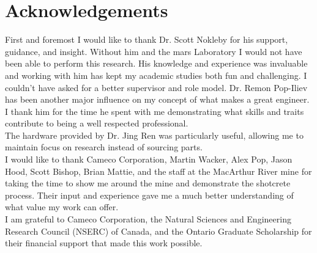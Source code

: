 \chapter*{Acknowledgements}
First and foremost I would like to thank Dr. Scott Nokleby for his support, guidance, and insight. Without him and the \acrshort{mars} Laboratory I would not have been able to perform this research. His knowledge and experience was invaluable and working with him has kept my academic studies both fun and challenging. I couldn't have asked for a better supervisor and role model. Dr. Remon Pop-Iliev has been another major influence on my concept of what makes a great engineer. I thank him for the time he spent with me demonstrating what skills and traits contribute to being a well respected professional.\\

The hardware provided by Dr. Jing Ren was particularly useful, allowing me to maintain focus on research instead of sourcing parts.\\

I would like to thank Cameco Corporation, Martin Wacker, Alex Pop, Jason Hood, Scott Bishop, Brian Mattie, and the staff at the MacArthur River mine for taking the time to show me around the mine and demonstrate the shotcrete process. Their input and experience gave me a much better understanding of what value my work can offer.\\

I am grateful to Cameco Corporation, the Natural Sciences and Engineering Research Council (NSERC) of Canada, and the Ontario Graduate Scholarship for their financial support that made this work possible.\\



